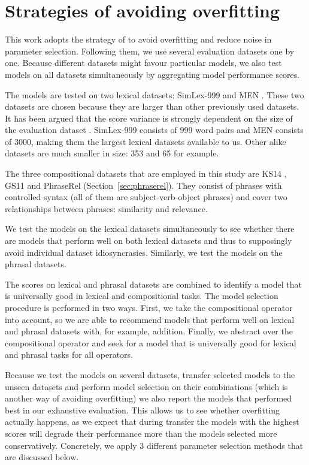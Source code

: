 \section{Strategies of avoiding overfitting}
\label{sec:avoiding-overfitting}

This work adopts the strategy of  to avoid overfitting and reduce noise in parameter selection. Following them, we use several evaluation datasets one by one. Because different datasets might favour particular models, we also test models on all datasets simultaneously by aggregating model performance scores.

The models are tested on two lexical datasets: SimLex-999 \cite{hill2014simlex} and MEN \cite{Bruni:2014:MDS:2655713.2655714}. These two datasets are chosen because they are larger than other previously used datasets. It has been argued that the score variance is strongly dependent on the size of the evaluation dataset \cite{W16-2502}. SimLex-999 consists of 999 word pairs and MEN consists of 3000, making them the largest lexical datasets available to us. Other alike datasets are much smaller in size: 353 \cite{2002:PSC:503104.503110} and 65 \cite{Rubenstein:1965:CCS:365628.365657} for example.

The three compositional datasets that are employed in this study are KS14 \cite{kartsadrqpl2014}, GS11 \cite{Grefenstette:2011:ESC:2145432.2145580} and PhraseRel (Section~\ref{sec:phraserel}). They consist of phrases with controlled syntax (all of them are subject-verb-object phrases) and cover two relationships between phrases: similarity and relevance.

We test the models on the lexical datasets simultaneously to see whether there are models that perform well on both lexical datasets and thus to supposingly avoid individual dataset idiosyncrasies. Similarly, we test the models on the phrasal datasets.

The scores on lexical and phrasal datasets are combined
to identify a model that is universally good in lexical and compositional tasks. The model selection procedure is performed in two ways. First, we take the compositional operator into account, so we are able to recommend models that perform well on lexical and phrasal datasets with, for example, addition. Finally, we abstract over the compositional operator and seek for a model that is universally good for lexical and phrasal tasks for all operators.

Because we test the models on several datasets, transfer selected models to the unseen datasets and perform model selection on their combinations (which is another way of avoiding overfitting) we also report the models that performed best in our exhaustive evaluation. This allows us to see whether overfitting actually happens, as we expect that during transfer the models with the highest scores will degrade their performance more than the models selected more conservatively. Concretely, we apply 3 different parameter selection methods that are discussed below.

